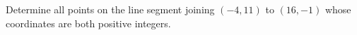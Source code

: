 Determine all points on the line segment joining $(-4,11)$ to $(16,-1)$ whose coordinates are both positive integers.
